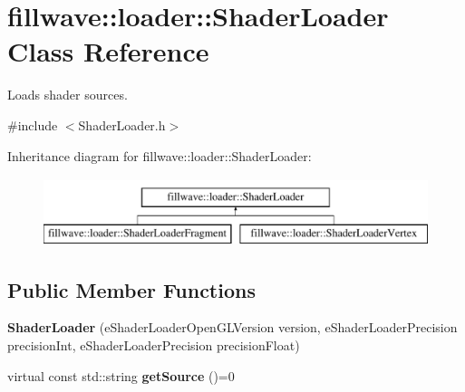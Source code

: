 \hypertarget{classfillwave_1_1loader_1_1ShaderLoader}{}\section{fillwave\+:\+:loader\+:\+:Shader\+Loader Class Reference}
\label{classfillwave_1_1loader_1_1ShaderLoader}


Loads shader sources.  




{\ttfamily \#include $<$Shader\+Loader.\+h$>$}

Inheritance diagram for fillwave\+:\+:loader\+:\+:Shader\+Loader\+:\begin{figure}[H]
\begin{center}
\leavevmode
\includegraphics[height=2.000000cm]{classfillwave_1_1loader_1_1ShaderLoader}
\end{center}
\end{figure}
\subsection*{Public Member Functions}
\begin{DoxyCompactItemize}
\item 
\hypertarget{classfillwave_1_1loader_1_1ShaderLoader_a9e56f85a1a5d5f9ce5555649f25aa7f9}{}{\bfseries Shader\+Loader} (e\+Shader\+Loader\+Open\+G\+L\+Version version, e\+Shader\+Loader\+Precision precision\+Int, e\+Shader\+Loader\+Precision precision\+Float)\label{classfillwave_1_1loader_1_1ShaderLoader_a9e56f85a1a5d5f9ce5555649f25aa7f9}

\item 
\hypertarget{classfillwave_1_1loader_1_1ShaderLoader_a390ce6eae5c36b7cc3ec61f66f981f95}{}virtual const std\+::string {\bfseries get\+Source} ()=0\label{classfillwave_1_1loader_1_1ShaderLoader_a390ce6eae5c36b7cc3ec61f66f981f95}

\end{DoxyCompactItemize}
